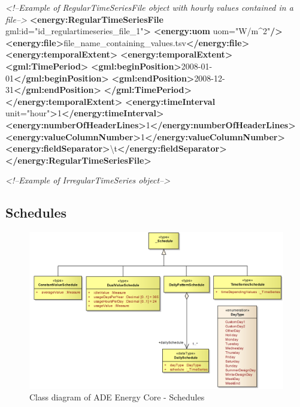 \documentclass[a4paper,12pt]{article}
\newenvironment{Shaded}{}{}
\newcommand{\KeywordTok}[1]{\textcolor[rgb]{0.00,0.44,0.13}{\textbf{{#1}}}}
\newcommand{\StringTok}[1]{\textcolor[rgb]{0.25,0.44,0.63}{{#1}}}
\newcommand{\CommentTok}[1]{\textcolor[rgb]{0.38,0.63,0.69}{\textit{{#1}}}}
\newcommand{\OtherTok}[1]{\textcolor[rgb]{0.00,0.44,0.13}{{#1}}}
\newcommand{\NormalTok}[1]{{#1}}
\begin{document}
\begin{Shaded}
\begin{Highlighting}[]
\CommentTok{<!--Example of RegularTimeSeriesFile object with hourly values contained in a file-->}
\KeywordTok{<energy:RegularTimeSeriesFile}\OtherTok{ gml:id=}\StringTok{"id_regulartimeseries_file_1"}\KeywordTok{>}
    \KeywordTok{<energy:uom}\OtherTok{ uom=}\StringTok{"W/m^2"}\KeywordTok{/>}
    \KeywordTok{<energy:file>}\NormalTok{file_name_containing_values.tsv}\KeywordTok{</energy:file>}
    \KeywordTok{<energy:temporalExtent>}
    \KeywordTok{<energy:temporalExtent>}
        \KeywordTok{<gml:TimePeriod>}
            \KeywordTok{<gml:beginPosition>}\NormalTok{2008-01-01}\KeywordTok{</gml:beginPosition>}
            \KeywordTok{<gml:endPosition>}\NormalTok{2008-12-31}\KeywordTok{</gml:endPosition>}
        \KeywordTok{</gml:TimePeriod>}
    \KeywordTok{</energy:temporalExtent>}
    \KeywordTok{<energy:timeInterval}\OtherTok{ unit=}\StringTok{"hour"}\KeywordTok{>}\NormalTok{1}\KeywordTok{</energy:timeInterval>}
    \KeywordTok{<energy:numberOfHeaderLines>}\NormalTok{1}\KeywordTok{</energy:numberOfHeaderLines>}
    \KeywordTok{<energy:valueColumnNumber>}\NormalTok{1}\KeywordTok{</energy:valueColumnNumber>}
    \KeywordTok{<energy:fieldSeparator>}\NormalTok{\textbackslash{}t}\KeywordTok{</energy:fieldSeparator>}
\KeywordTok{</energy:RegularTimeSeriesFile>}
\end{Highlighting}
\end{Shaded}

\begin{Shaded}
\begin{Highlighting}[]
\CommentTok{<!--Example of IrregularTimeSeries object-->}
\end{Highlighting}
\end{Shaded}

\subsection{Schedules}\label{schedules}

\begin{figure}[htbp]
\centering
\includegraphics{fig/class_schedules.png}
\caption{Class diagram of ADE Energy Core - Schedules}
\end{figure}
\end{document}

